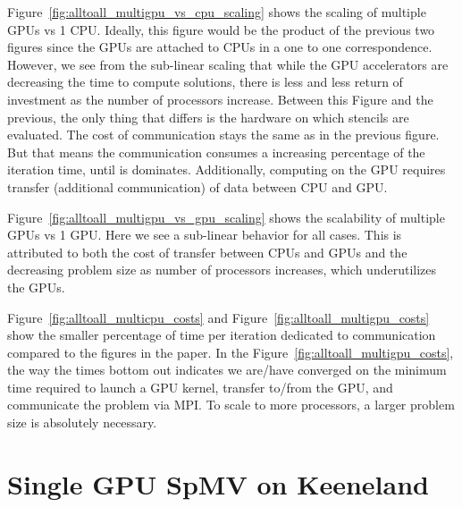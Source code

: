 Figure~\ref{fig:alltoall_multigpu_vs_cpu_scaling}  shows the scaling of multiple GPUs vs 1 CPU. Ideally, this figure would be the product of the previous two figures since the GPUs are attached to CPUs in a one to one correspondence. However, we see from the sub-linear scaling that while the GPU accelerators are decreasing the time to compute solutions, there is less and less return of investment as the number of processors increase. Between this Figure and the previous, the only thing that differs is the hardware on which stencils are evaluated. The cost of communication stays the same as in the previous figure. But that means the communication consumes a increasing percentage of the iteration time, until is dominates. 
Additionally, computing on the GPU requires transfer (additional communication) of data between CPU and GPU. 

Figure~\ref{fig:alltoall_multigpu_vs_gpu_scaling} shows the scalability of multiple GPUs vs 1 GPU. Here we see a sub-linear behavior for all cases. This is attributed to both the cost of transfer between CPUs and GPUs and the decreasing problem size as number of processors increases, which underutilizes the GPUs. 


Figure~\ref{fig:alltoall_multicpu_costs} and Figure~\ref{fig:alltoall_multigpu_costs} show the smaller percentage of time per iteration dedicated to communication compared to the figures in the paper. In the Figure~\ref{fig:alltoall_multigpu_costs}, the way the times bottom out indicates we are/have converged on the minimum time required to launch a GPU kernel, transfer to/from the GPU, and communicate the problem via MPI. To scale to more processors, a larger problem size is absolutely necessary.

\section{Single GPU SpMV on Keeneland} 


